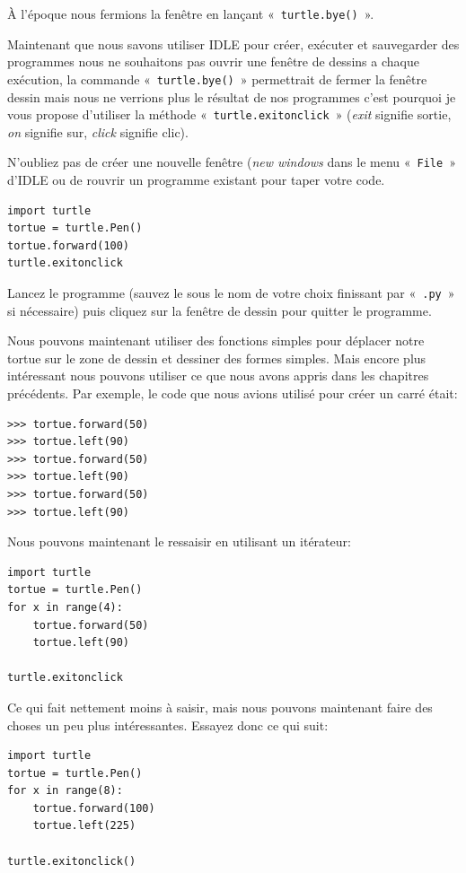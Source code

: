À l'époque nous fermions la fenêtre en lançant «~\texttt{turtle.bye()}~».

Maintenant que nous savons utiliser IDLE pour créer, exécuter et sauvegarder des programmes nous ne souhaitons pas ouvrir une  fenêtre de dessins a chaque exécution, la commande «~\texttt{turtle.bye()}~» permettrait de fermer la fenêtre dessin mais nous ne verrions plus le résultat de nos programmes c'est pourquoi je vous propose d'utiliser 
la méthode «~\texttt{turtle.exitonclick}~»  (\emph{exit} signifie sortie, \emph{on} signifie sur, \emph{click} signifie clic).

N'oubliez pas de créer une nouvelle fenêtre (\emph{new windows} dans le menu «~\texttt{File}~» d'IDLE ou de rouvrir un programme existant pour taper votre code.

\begin{Verbatim}[frame=single,rulecolor=\color{mbleu}, label=à taper]
import turtle
tortue = turtle.Pen()
tortue.forward(100)
turtle.exitonclick
\end{Verbatim}

Lancez le programme (sauvez le sous le nom de votre choix finissant par «~\texttt{.py}~» si nécessaire) puis cliquez sur la fenêtre de dessin pour quitter le programme.

Nous pouvons maintenant utiliser des fonctions simples pour déplacer notre tortue sur le zone de dessin et dessiner des formes simples. Mais encore plus intéressant nous pouvons utiliser ce que nous avons appris dans les chapitres précédents. Par exemple, le code que nous avions utilisé pour créer un carré était:

\begin{Verbatim}[frame=single,rulecolor=\color{gray}, label=ne pas saisir]
>>> tortue.forward(50)
>>> tortue.left(90)
>>> tortue.forward(50)
>>> tortue.left(90)
>>> tortue.forward(50)
>>> tortue.left(90)
\end{Verbatim}

Nous pouvons maintenant le ressaisir en utilisant un itérateur:

\begin{Verbatim}[frame=single,rulecolor=\color{mbleu}, label=à taper]
import turtle
tortue = turtle.Pen()
for x in range(4):
    tortue.forward(50)
    tortue.left(90)
    
turtle.exitonclick
\end{Verbatim}

Ce qui fait nettement moins à saisir, mais nous pouvons maintenant faire des choses un peu plus intéressantes. Essayez donc ce qui suit:
\begin{Verbatim}[frame=single,rulecolor=\color{mbleu}, label=à taper]
import turtle
tortue = turtle.Pen()
for x in range(8):
    tortue.forward(100)
    tortue.left(225)
    
turtle.exitonclick()
\end{Verbatim}

